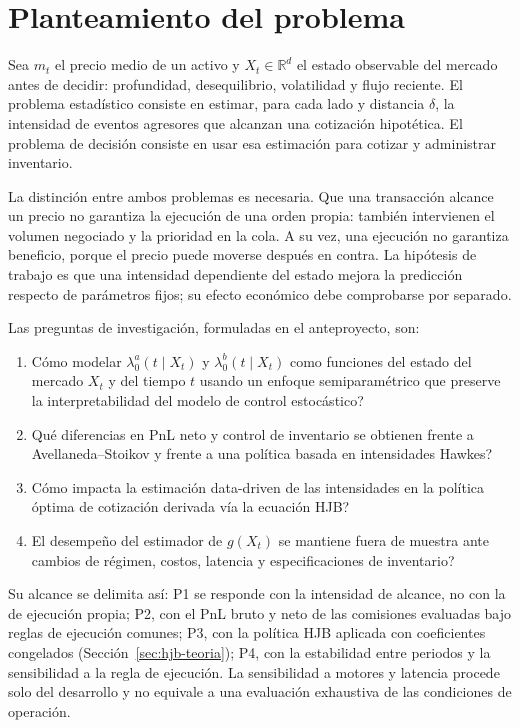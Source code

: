 \chapter{Planteamiento del problema}

Sea $m_t$ el precio medio de un activo y $X_t\in\mathbb R^d$ el estado observable del mercado antes de decidir: profundidad, desequilibrio, volatilidad y flujo reciente. El problema estadístico consiste en estimar, para cada lado y distancia $\delta$, la intensidad de eventos agresores que alcanzan una cotización hipotética. El problema de decisión consiste en usar esa estimación para cotizar y administrar inventario.

La distinción entre ambos problemas es necesaria. Que una transacción alcance un precio no garantiza la ejecución de una orden propia: también intervienen el volumen negociado y la prioridad en la cola. A su vez, una ejecución no garantiza beneficio, porque el precio puede moverse después en contra. La hipótesis de trabajo es que una intensidad dependiente del estado mejora la predicción respecto de parámetros fijos; su efecto económico debe comprobarse por separado.

Las preguntas de investigación, formuladas en el anteproyecto, son:
\begin{enumerate}[label=\textbf{P\arabic*.}]
  \item \textquestiondown{}Cómo modelar $\lambda_0^a(t\mid X_t)$ y $\lambda_0^b(t\mid X_t)$ como
        funciones del estado del mercado $X_t$ y del tiempo $t$ usando un enfoque
        semiparamétrico que preserve la interpretabilidad del modelo de control
        estocástico?
  \item \textquestiondown{}Qué diferencias en PnL neto y control de inventario se obtienen frente a
        Avellaneda--Stoikov y frente a una política basada en intensidades Hawkes?
  \item \textquestiondown{}Cómo impacta la estimación data-driven de las intensidades en la política
        óptima de cotización derivada vía la ecuación HJB?
  \item \textquestiondown{}El desempeño del estimador de $g(X_t)$ se mantiene fuera de muestra ante
        cambios de régimen, costos, latencia y especificaciones de inventario?
\end{enumerate}

Su alcance se delimita así: P1 se responde con la intensidad de alcance, no con la de ejecución propia; P2, con el PnL bruto y neto de las comisiones evaluadas bajo reglas de ejecución comunes; P3, con la política HJB aplicada con coeficientes congelados (Sección~\ref{sec:hjb-teoria}); P4, con la estabilidad entre periodos y la sensibilidad a la regla de ejecución. La sensibilidad a motores y latencia procede solo del desarrollo y no equivale a una evaluación exhaustiva de las condiciones de operación.
